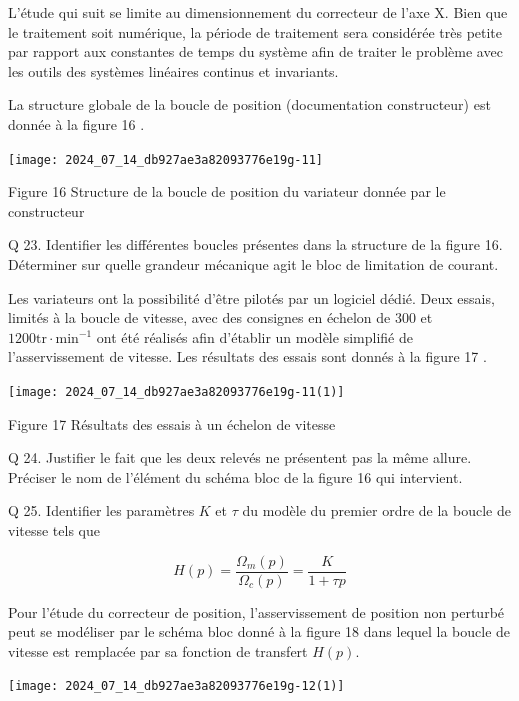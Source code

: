 \documentclass[10pt]{article}
\begin{document}
L'étude qui suit se limite au dimensionnement du correcteur de l'axe X. Bien que le traitement soit numérique, la période de traitement sera considérée très petite par rapport aux constantes de temps du système afin de traiter le problème avec les outils des systèmes linéaires continus et invariants.

La structure globale de la boucle de position (documentation constructeur) est donnée à la figure 16 .

\begin{center}
\texttt{[image: 2024\_07\_14\_db927ae3a82093776e19g-11]}
\end{center}

Figure 16 Structure de la boucle de position du variateur donnée par le constructeur

Q 23. Identifier les différentes boucles présentes dans la structure de la figure 16. Déterminer sur quelle grandeur mécanique agit le bloc de limitation de courant.

Les variateurs ont la possibilité d'être pilotés par un logiciel dédié. Deux essais, limités à la boucle de vitesse, avec des consignes en échelon de 300 et $1200 \mathrm{tr} \cdot \mathrm{min}^{-1}$ ont été réalisés afin d'établir un modèle simplifié de l'asservissement de vitesse. Les résultats des essais sont donnés à la figure 17 .

\begin{center}
\texttt{[image: 2024\_07\_14\_db927ae3a82093776e19g-11(1)]}
\end{center}

Figure 17 Résultats des essais à un échelon de vitesse

Q 24. Justifier le fait que les deux relevés ne présentent pas la même allure. Préciser le nom de l'élément du schéma bloc de la figure 16 qui intervient.

Q 25. Identifier les paramètres $K$ et $\tau$ du modèle du premier ordre de la boucle de vitesse tels que

$$
H(p)=\frac{\Omega_{m}(p)}{\Omega_{c}(p)}=\frac{K}{1+\tau p}
$$

Pour l'étude du correcteur de position, l'asservissement de position non perturbé peut se modéliser par le schéma bloc donné à la figure 18 dans lequel la boucle de vitesse est remplacée par sa fonction de transfert $H(p)$.

\begin{center}
\texttt{[image: 2024\_07\_14\_db927ae3a82093776e19g-12(1)]}
\end{center}
\end{document}
